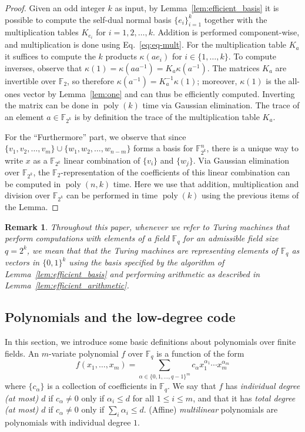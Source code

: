 \documentclass[11pt]{article}
\newtheorem{remark}[theorem]{Remark}
\theoremstyle{definition}
\newcommand{\F}{\ensuremath{\mathbb{F}}}
\newcommand{\downsize}{\kappa}
\DeclareMathOperator{\poly}{poly}
\begin{document}
\begin{proof}
  Given an odd integer $k$ as input, by Lemma~\ref{lem:efficient_basis} it is
  possible to compute the self-dual normal basis $\{e_i\}_{i=1}^k$ together with the
  multiplication tables $K_{e_i}$ for $i = 1, 2, \ldots, k$.
  Addition is performed component-wise, and multiplication is done
  using Eq.~\eqref{eq:eq-mult}.
  For the multiplication table $K_a$ it suffices to compute the $k$ products
  $\downsize(a e_i)$ for $i\in\{1,\ldots,k\}$.
  To compute inverses, observe that $\downsize(1) = \downsize(aa^{-1}) = K_a
  \downsize(a^{-1})$.
  The matrices $K_a$ are invertible over $\F_2$, so therefore $\downsize(a^{-1}) =
  K_a^{-1} \downsize(1)$; moreover, $\kappa(1)$ is the all-ones vector
  by Lemma~\ref{lem:one} and can thus be efficiently computed.
  Inverting the matrix can be done in $\poly(k)$ time via Gaussian elimination.
  The trace of an element $a \in \F_{2^k}$ is by definition the trace of the
  multiplication table $K_a$.

  For the ``Furthermore'' part, we observe that since $\{v_1, v_2, \ldots, v_m
  \} \cup \{w_1, w_2, \ldots, w_{n-m} \}$ forms a basis for $\F_{2^k}^n$, there
  is a unique way to write $x$ as a $\F_{2^k}$ linear combination of $\{ v_i\}$
  and $\{w_j\}$.
  Via Gaussian elimination over $\F_{2^k}$, the $\F_2$-representation of the
  coefficients of this linear combination can be computed in $\poly(n,k)$ time.
  Here we use that addition, multiplication and division over $\F_{2^k}$ can be
  performed in time $\poly(k)$ using the previous items of the Lemma.
\end{proof}

\begin{remark}
  \label{rmk:tm_fields}
  Throughout this paper, whenever we refer to Turing machines that perform
  computations with elements of a field $\F_q$ for an admissible field size $q =
  2^k$, we mean that that the Turing machines are representing elements of
  $\F_q$ as vectors in $\{0,1\}^{k}$ using the basis specified by the
  algorithm of Lemma~\ref{lem:efficient_basis} and performing arithmetic as
  described in Lemma~\ref{lem:efficient_arithmetic}.
\end{remark}

\subsection{Polynomials and the low-degree code}
\label{sec:ld-encoding}

In this section, we introduce some basic definitions about polynomials over finite fields. 
An $m$-variate polynomial $f$ over $\F_q$ is a function of the form
\[
	f(x_1,\ldots,x_m) = \sum_{\alpha \in \{0,1,\ldots,q-1\}^m} c_\alpha
  x_1^{\alpha_1} \cdots x_m^{\alpha_m}
\]
where $\{c_\alpha\}$ is a collection of coefficients in $\F_q$.
We say that $f$ has \emph{individual degree (at most) $d$} if $c_\alpha\neq 0$ only if
$\alpha_i \leq d $ for all $1\leq i\leq m$, and that it has \emph{total degree
  (at most) $d$} if $c_\alpha\neq 0$ only if $\sum_i \alpha_i \leq d$.
(Affine) \emph{multilinear} polynomials are polynomials with individual degree
$1$.
\end{document}
